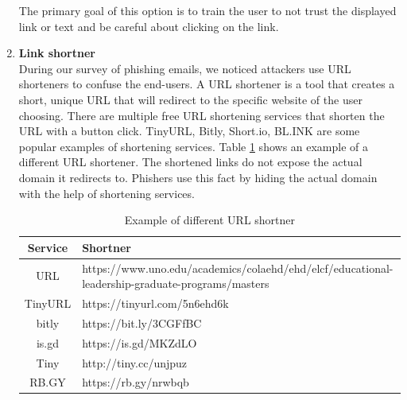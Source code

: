 \begin{enumerate}
          The primary goal of this option is to train the user to not trust the displayed link or text and be careful about clicking on the link.

    \item \textbf{Link shortner}\\
          During our survey of phishing emails, we noticed attackers use URL shorteners to confuse the end-users. A URL shortener is a tool that creates a short, unique URL that will redirect to the specific website of the user choosing. There are multiple free URL shortening services that shorten the URL with a button click. TinyURL, Bitly, Short.io, BL.INK are some popular examples of shortening services. Table \ref{tab:shortner} shows an example of a different URL shortener. The shortened links do not expose the actual domain it redirects to. Phishers use this fact by hiding the actual domain with the help of shortening services.

          \begin{table}
              \centering
              \begin{tabular}{c p{}}
                  \textbf{Service} & \textbf{Shortner}                                                                               \\
                  \hline
                  URL              & https://www.uno.edu/academics/colaehd/ehd/elcf/educational-leadership-graduate-programs/masters \\
                  \hfill
                  TinyURL          & https://tinyurl.com/5n6ehd6k                                                                    \\
                  bitly            & https://bit.ly/3CGFfBC                                                                          \\
                  is.gd            & https://is.gd/MKZdLO                                                                            \\
                  Tiny             & http://tiny.cc/unjpuz                                                                           \\
                  RB.GY            & https://rb.gy/nrwbqb                                                                            \\
              \end{tabular}
              \caption{Example of different URL shortner }
              \label{tab:shortner}
          \end{table}


\end{enumerate}
